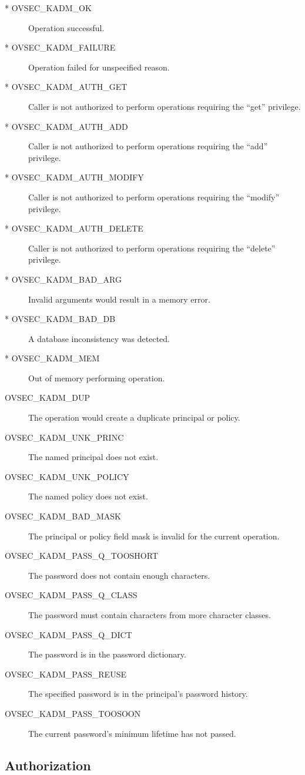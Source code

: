 \begin{description}
\item[* OVSEC_KADM_OK] Operation successful.
\item[* OVSEC_KADM_FAILURE] Operation failed for unspecified reason.
\item[* OVSEC_KADM_AUTH_GET] Caller is not authorized to perform
operations requiring the ``get'' privilege.
\item[* OVSEC_KADM_AUTH_ADD] Caller is not authorized to perform
operations requiring the ``add'' privilege.
\item[* OVSEC_KADM_AUTH_MODIFY] Caller is not authorized to perform
operations requiring the ``modify'' privilege.
\item[* OVSEC_KADM_AUTH_DELETE] Caller is not authorized to perform
operations requiring the ``delete'' privilege.
\item[* OVSEC_KADM_BAD_ARG] Invalid arguments would result in a memory
error.
\item[* OVSEC_KADM_BAD_DB] A database inconsistency was detected.
\item[* OVSEC_KADM_MEM] Out of memory performing operation.
\item[OVSEC_KADM_DUP] The operation would create a duplicate principal or
policy.
\item[OVSEC_KADM_UNK_PRINC]  The named principal does not exist.
\item[OVSEC_KADM_UNK_POLICY] The named policy does not exist.
\item[OVSEC_KADM_BAD_MASK] The principal or policy field mask is invalid
for the current operation.
\item[OVSEC_KADM_PASS_Q_TOOSHORT] The password does not contain enough
characters.
\item[OVSEC_KADM_PASS_Q_CLASS] The password must contain characters
from more character classes.
\item[OVSEC_KADM_PASS_Q_DICT] The password is in the password
dictionary.
\item[OVSEC_KADM_PASS_REUSE] The specified password is in the principal's
password history.
\item[OVSEC_KADM_PASS_TOOSOON] The current password's minimum lifetime
has not passed.
\end{description}

\subsection{Authorization}

